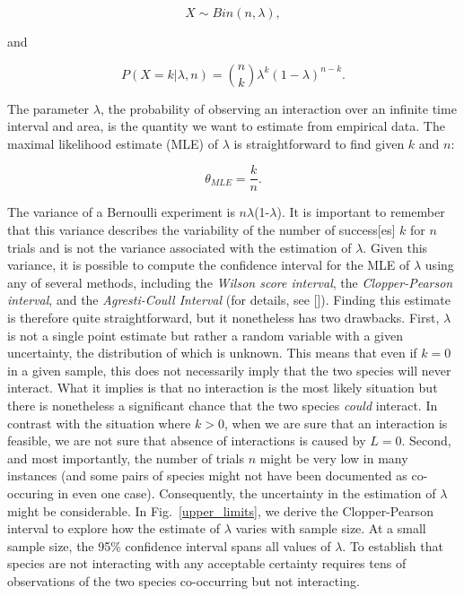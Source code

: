 \documentclass[12pt]{article}
\begin{document}
      \begin{equation}
        X \sim Bin(n,\lambda) ,
      \end{equation}

      \noindent and 

      \begin{equation}
         P(X = k|\lambda,n) = {n \choose k}\lambda^k(1-\lambda)^{n-k} . 
         \label{likelihood}
      \end{equation}

  \noindent The parameter $\lambda$, the probability of observing an interaction over an infinite time interval and area, is the quantity we want to estimate from empirical data. 
  The maximal likelihood estimate (MLE) of $\lambda$ is straightforward to find given $k$ and $n$:

      \begin{equation}
        \theta_{MLE} = \frac{k}{n}  .
        \label{theta_MLE}
      \end{equation}

  The variance of a Bernoulli experiment is $n\lambda$(1-$\lambda$). It is important to remember that this variance describes the variability of the number of success[es] $k$ for $n$ trials and is not the variance associated with the estimation of $\lambda$.
  Given this variance, it is possible to compute the confidence interval for the MLE of $\lambda$ using any of several methods, including the \emph{Wilson score interval}, the \emph{Clopper-Pearson interval}, and the \emph{Agresti-Coull Interval} (for details, see [\citealp{}]). Finding this estimate is therefore quite straightforward, but it nonetheless has two drawbacks. First, $\lambda$ is not a single point estimate but rather a random variable with a given uncertainty, the distribution of which is unknown. This means that even if $k = 0$ in a given sample, this does not necessarily imply that the two species will never interact. What it implies is that no interaction is the most likely situation but there is nonetheless a significant chance that the two species \emph{could} interact. In contrast with the situation where $k>0$, when we are sure that an interaction is feasible, 
  we are not sure that absence of interactions is caused by $L=0$. Second, and most importantly, the number of trials $n$ might be very low in many instances (and some pairs of species might not have been documented as co-occuring in even one case). Consequently, the uncertainty in the estimation of $\lambda$ might be considerable. In Fig.~\ref{upper_limits}, we derive the Clopper-Pearson interval to explore how the estimate of $\lambda$ varies with sample size. At a small sample size, the 95\% confidence interval spans all values of $\lambda$. To establish that species are not interacting with any acceptable certainty requires tens of observations of the two species co-occurring but not interacting.
\end{document}
